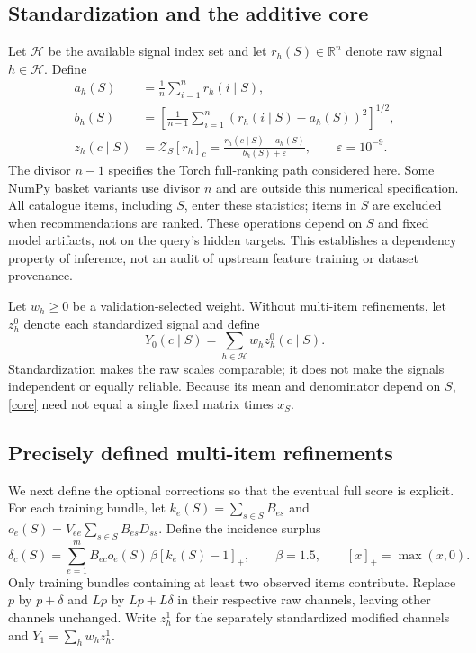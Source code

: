 \documentclass[11pt,a4paper]{article}
\newcommand{\pos}[1]{\left[#1\right]_+}
\newcommand{\Z}{\mathcal Z_S}
\begin{document}
\subsection{Standardization and the additive core}
Let $\mathcal H$ be the available signal index set and let
$r_h(S)\in\mathbb R^n$ denote raw signal $h\in\mathcal H$. Define
\begin{align}
 a_h(S)&=\frac1n\sum_{i=1}^n r_h(i\mid S),\\
 b_h(S)&=\left[\frac{1}{n-1}\sum_{i=1}^n
          (r_h(i\mid S)-a_h(S))^2\right]^{1/2},\\
 z_h(c\mid S)&=\Z[r_h]_c
 =\frac{r_h(c\mid S)-a_h(S)}{b_h(S)+\varepsilon},\qquad \varepsilon=10^{-9}.
\end{align}
The divisor $n-1$ specifies the Torch full-ranking path considered here. Some
NumPy basket variants use divisor $n$ and are outside this numerical specification.
All catalogue items, including $S$, enter these statistics; items in $S$ are excluded
when recommendations are ranked. These operations depend on $S$ and fixed model
artifacts, not on the query's hidden targets. This establishes a dependency property
of inference, not an audit of upstream feature training or dataset provenance.

Let $w_h\geq0$ be a validation-selected weight. Without multi-item refinements,
let $z_h^0$ denote each standardized signal and define
\begin{equation}\label{core}
 Y_0(c\mid S)=\sum_{h\in\mathcal H}w_hz_h^0(c\mid S).
\end{equation}
Standardization makes the raw scales comparable; it does not make the signals
independent or equally reliable. Because its mean and denominator depend on $S$,
\eqref{core} need not equal a single fixed matrix times $x_S$.

\subsection{Precisely defined multi-item refinements}
We next define the optional corrections so that the eventual full score is explicit.
For each training bundle, let $k_e(S)=\sum_{s\in S}B_{es}$ and
$o_e(S)=V_{ee}\sum_{s\in S}B_{es}D_{ss}$. Define the incidence surplus
\begin{equation}
 \delta_c(S)=\sum_{e=1}^mB_{ec}o_e(S)\,\beta\pos{k_e(S)-1},
 \qquad \beta=1.5,\qquad \pos{x}=\max(x,0).
\end{equation}
Only training bundles containing at least two observed items contribute. Replace
$p$ by $p+\delta$ and $Lp$ by $Lp+L\delta$ in their respective raw channels, leaving
other channels unchanged. Write $z_h^1$ for the separately standardized modified
channels and $Y_1=\sum_h w_hz_h^1$.
\end{document}
